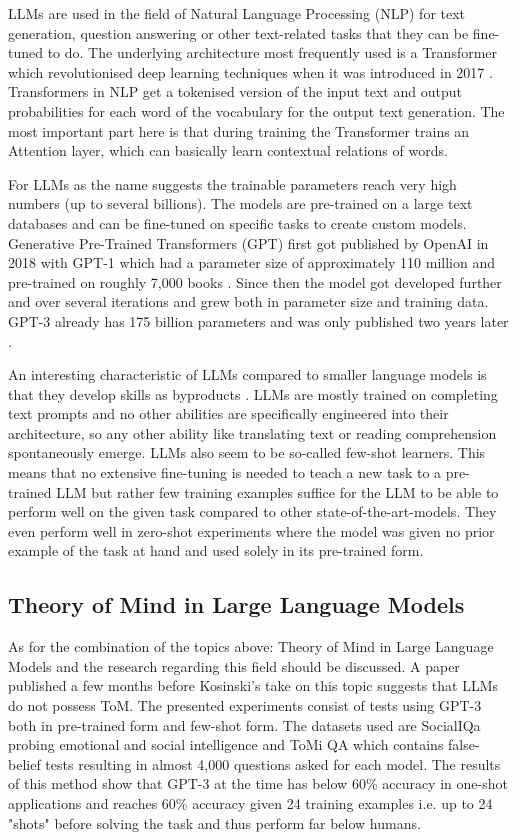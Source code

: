 LLMs are used in the field of Natural Language Processing (NLP) for text generation, question answering or other text-related tasks that they can be fine-tuned to do. The underlying architecture most frequently used is a Transformer which revolutionised deep learning techniques when it was introduced in 2017 \cite{attention}. Transformers in NLP get a tokenised version of the input text and output probabilities for each word of the vocabulary for the output text generation. The most important part here is that during training the Transformer trains an Attention layer, which can basically learn contextual relations of words.

For LLMs as the name suggests the trainable parameters reach very high numbers (up to several billions). The models are pre-trained on a large text databases and can be fine-tuned on specific tasks to create custom models. Generative Pre-Trained Transformers (GPT) first got published by OpenAI in 2018 with GPT-1 which had a parameter size of approximately 110 million and pre-trained on roughly 7,000 books \cite{gpt1}. Since then the model got developed further and over several iterations and grew both in parameter size and training data. GPT-3 already has 175 billion parameters and was only published two years later \cite{gpt3}.

An interesting characteristic of LLMs compared to smaller language models is that they develop skills as byproducts \cite{llms}. LLMs are mostly trained on completing text prompts and no other abilities are specifically engineered into their architecture, so any other ability like translating text or reading comprehension spontaneously emerge. LLMs also seem to be so-called few-shot learners. This means that no extensive fine-tuning is needed to teach a new task to a pre-trained LLM but rather few training examples suffice for the LLM to be able to perform well on the given task compared to other state-of-the-art-models. They even perform well in zero-shot experiments where the model was given no prior example of the task at hand and used solely in its pre-trained form. \cite{gpt3}

\subsection{Theory of Mind in Large Language Models}
As for the combination of the topics above: Theory of Mind in Large Language Models and the research regarding this field should be discussed. A paper published a few months before Kosinski's take on this topic suggests that LLMs do not possess ToM. The presented experiments consist of tests using GPT-3 both in pre-trained form and few-shot form. The datasets used are SocialIQa probing emotional and social intelligence \cite{socialiqa} and ToMi QA \cite{tomi} which contains false-belief tests resulting in almost 4,000 questions asked for each model. The results of this method show that GPT-3 at the time has below 60\% accuracy in one-shot applications and reaches 60\% accuracy given 24 training examples i.e. up to 24 "shots" before solving the task and thus perform far below humans. \cite{related}

